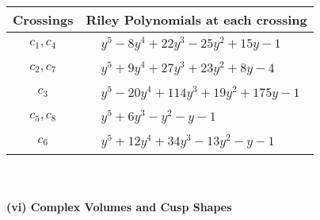 \documentclass[1p]{elsarticle_modified}
\theoremstyle{definition}
\begin{document}
\begin{tabular}{m{50pt}|m{274pt}}
Crossings & \hspace{64pt}Riley Polynomials at each crossing \\
\hline $$\begin{aligned}c_{1},c_{4}\end{aligned}$$&$\begin{aligned}
&y^5-8 y^4+22 y^3-25 y^2+15 y-1
\end{aligned}$\\
\hline $$\begin{aligned}c_{2},c_{7}\end{aligned}$$&$\begin{aligned}
&y^5+9 y^4+27 y^3+23 y^2+8 y-4
\end{aligned}$\\
\hline $$\begin{aligned}c_{3}\end{aligned}$$&$\begin{aligned}
&y^5-20 y^4+114 y^3+19 y^2+175 y-1
\end{aligned}$\\
\hline $$\begin{aligned}c_{5},c_{8}\end{aligned}$$&$\begin{aligned}
&y^5+6 y^3- y^2- y-1
\end{aligned}$\\
\hline $$\begin{aligned}c_{6}\end{aligned}$$&$\begin{aligned}
&y^5+12 y^4+34 y^3-13 y^2- y-1
\end{aligned}$\\
\hline
\end{tabular}\\~\\
\newpage\flushleft \textbf{(vi) Complex Volumes and Cusp Shapes}
\end{document}
